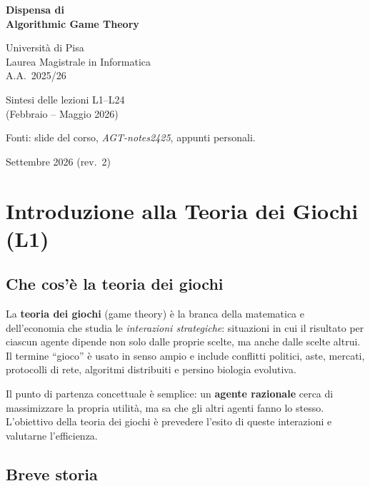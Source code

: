 \documentclass[12pt,a4paper,twoside]{book}
\theoremstyle{plain}
\theoremstyle{definition}
\begin{document}
\begin{titlepage}
\centering
\vspace*{3cm}
{\LARGE\bfseries Dispensa di\\[0.4em] Algorithmic Game Theory\par}
\vspace{1.5cm}
{\large Università di Pisa\\
Laurea Magistrale in Informatica\\
A.A.\ 2025/26\par}
\vspace{1cm}
{\normalsize Sintesi delle lezioni L1--L24\\
(Febbraio -- Maggio 2026)\par}
\vspace{0.8cm}
{\small Fonti: slide del corso, \textit{AGT-notes2425}, appunti personali.\par}
\vfill
{\small Settembre 2026 (rev.\ 2)}
\end{titlepage}

\frontmatter
\tableofcontents

\mainmatter

\chapter{Introduzione alla Teoria dei Giochi (L1)}

\section{Che cos'è la teoria dei giochi}

La \textbf{teoria dei giochi} (game theory) è la branca della matematica e dell'economia che studia le \emph{interazioni strategiche}: situazioni in cui il risultato per ciascun agente dipende non solo dalle proprie scelte, ma anche dalle scelte altrui. Il termine ``gioco'' è usato in senso ampio e include conflitti politici, aste, mercati, protocolli di rete, algoritmi distribuiti e persino biologia evolutiva.

Il punto di partenza concettuale è semplice: un \textbf{agente razionale} cerca di massimizzare la propria utilità, ma sa che gli altri agenti fanno lo stesso. L'obiettivo della teoria dei giochi è prevedere l'esito di queste interazioni e valutarne l'efficienza.

\section{Breve storia}
\end{document}
